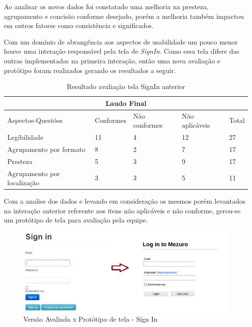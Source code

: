Ao analisar os novos dados foi constatado uma melhoria na presteza, agrupamento e concisão conforme desejado, porém a melhoria também impactou em outros fatores como consistência e significados.

Com um domínio de abrangência aos aspectos de usabilidade um pouco menor houve uma interação responsável pela tela de \textit{SignIn}. Como essa tela difere das outras implementadas na primeira interação, então uma nova avaliação e protótipo foram realizados gerando os resultados a seguir.

\begin{table}[h]
\begin{tabular}{|l|l|l|l|l|}
\hline
\multicolumn{5}{|c|}{\textbf{Laudo Final}}                                       \\ \hline
Aspectos-Questões           & Conformes & Não conformes & Não aplicáveis & Total \\ \hline
Legibilidade                & 11        & 4             & 12             & 27    \\ \hline
Agrupamento por formato     & 8         & 2             & 7              & 17    \\ \hline
Presteza                    & 5         & 3             & 9              & 17    \\ \hline
Agrupamento por localização & 3         & 3             & 5              & 11    \\ \hline
\end{tabular}
\caption{Resultado avaliação tela SignIn anterior}
\end{table}

Com a analise dos dados e levando em consideração os mesmos porém levantados na interação anterior referente aos itens não aplicáveis e não conforme, gerou-se um protótipo de tela para avaliação pela equipe.

\graphicspath{{figuras/}}
\begin{figure}[h]
\centering
\includegraphics[width=1.0\textwidth]{PrototipoSignIn}
\caption{Versão Avaliada x Protótipo de tela - Sign In}
\label{parallel-coordinate}
\end{figure}

